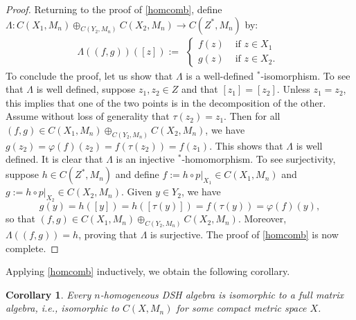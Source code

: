 \documentclass[12pt]{amsart}
\numberwithin{equation}{section}
\newtheorem{corollary}[theorem]{Corollary}
\theoremstyle{definition}
\theoremstyle{remark}
\newtheorem{remark}[theorem]{Remark}
\renewcommand\qedsymbol{/\hspace{-2pt}/}
\begin{document}
\begin{proof}
	\renewcommand\qedsymbol{/\hspace{-2pt}/}
	Returning to the proof of \autoref{homcomb}, define $\Lambda\colon C(X_{1},M_{n})\oplus_{C(Y_{2},M_{n})}C(X_{2},M_{n})\to C(Z^{*},M_{n})$ by:
	$$
	\Lambda((f,g))([z]):=
	\begin{aligned}
	\begin{cases}
	f(z)&\text{ if }z\in X_{1}\\
	g(z)&\text{ if }z\in X_{2}.
	\end{cases}
	\end{aligned}
	$$
	To conclude the proof, let us show that $\Lambda$ is a well-defined $^*$-isomorphism. To see that $\Lambda$ is well defined, suppose $z_{1},z_{2}\in Z$ and that $[z_{1}]=[z_{2}]$. Unless $z_{1}=z_{2}$, this implies that one of the two points is in the decomposition of the other. Assume without loss of generality that $\tau(z_{2})=z_{1}$. Then for all $(f,g)\in C(X_{1},M_{n})\oplus_{C(Y_{2},M_{n})}C(X_{2},M_{n})$, we have $g(z_{2})=\varphi(f)(z_{2})=f(\tau(z_{2}))=f(z_{1})$. This shows that $\Lambda$ is well defined. It is clear that $\Lambda$ is an injective $^*$-homomorphism. To see surjectivity, suppose $h\in C(Z^{*},M_{n})$ and define $f:=h\circ p|_{X_{1}}\in C(X_{1},M_{n})$ and $g:=h\circ p|_{X_{2}}\in C(X_{2},M_{n})$. Given $y\in Y_{2}$, we have
	$$
	g(y)=h([y])=h([\tau(y)])=f(\tau(y))=\varphi(f)(y),
	$$ 
	so that $(f,g)\in C(X_{1},M_{n})\oplus_{C(Y_{2},M_{n})}C(X_{2},M_{n})$. Moreover, $\Lambda((f,g))=h$, proving that $\Lambda$ is surjective. The proof of \autoref{homcomb} is now complete. 
\end{proof}

Applying \autoref{homcomb} inductively, we obtain the following corollary.

\begin{corollary}
	\label{homogeneous DSH}
	Every $n$-homogeneous DSH algebra is isomorphic to a full matrix algebra, i.e., isomorphic to $C(X,M_{n})$ for some compact metric space $X$.
\end{corollary}

\end{document}
